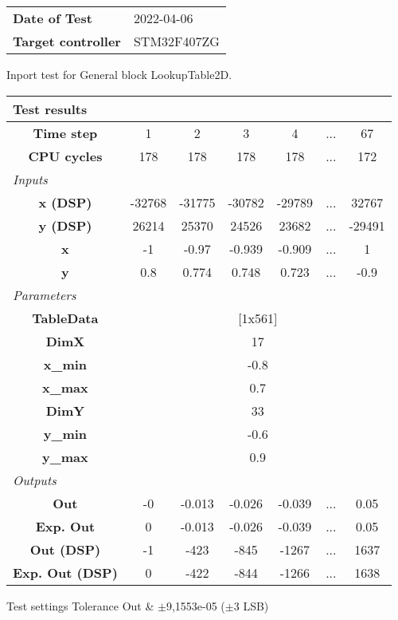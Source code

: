 \begin{tabular}{l l}
\textbf{Date of Test} & 2022-04-06 \tabularnewline
\textbf{Target controller} & STM32F407ZG \tabularnewline
\end{tabular}
\vspace{1ex}
Inport test for General block LookupTable2D.

\vspace{1em}
\begin{tabularx}{\textwidth}{|c|c|c|c|c|>{\centering\arraybackslash}X|c|}
\hline
\multicolumn{7}{|l|}{\cellcolor[gray]{0.8}\textbf{Test results}} \tabularnewline \hline
\textbf{Time step} & 1 & 2 & 3 & 4 & ... & 67 \tabularnewline \hline
\textbf{CPU cycles} & 178 & 178 & 178 & 178 & ... & 172 \tabularnewline \hline
\multicolumn{7}{|l|}{\cellcolor[gray]{0.9}\textit{Inputs}} \tabularnewline \hline
\textbf{x (DSP)} & -32768 & -31775 & -30782 & -29789 & ... & 32767 \tabularnewline \hline
\textbf{y (DSP)} & 26214 & 25370 & 24526 & 23682 & ... & -29491 \tabularnewline \hline
\textbf{x} & -1 & -0.97 & -0.939 & -0.909 & ... & 1 \tabularnewline \hline
\textbf{y} & 0.8 & 0.774 & 0.748 & 0.723 & ... & -0.9 \tabularnewline \hline
\multicolumn{7}{|l|}{\cellcolor[gray]{0.9}\textit{Parameters}} \tabularnewline \hline
\textbf{TableData} & \multicolumn{6}{c|}{[1x561]} \tabularnewline \hline
\textbf{DimX} & \multicolumn{6}{c|}{17} \tabularnewline \hline
\textbf{x\_min} & \multicolumn{6}{c|}{-0.8} \tabularnewline \hline
\textbf{x\_max} & \multicolumn{6}{c|}{0.7} \tabularnewline \hline
\textbf{DimY} & \multicolumn{6}{c|}{33} \tabularnewline \hline
\textbf{y\_min} & \multicolumn{6}{c|}{-0.6} \tabularnewline \hline
\textbf{y\_max} & \multicolumn{6}{c|}{0.9} \tabularnewline \hline
\multicolumn{7}{|l|}{\cellcolor[gray]{0.9}\textit{Outputs}} \tabularnewline \hline
\textbf{Out} & -0 & -0.013 & -0.026 & -0.039 & ... & 0.05 \tabularnewline \hline
\textbf{Exp. Out} & 0 & -0.013 & -0.026 & -0.039 & ... & 0.05 \tabularnewline \hline
\textbf{Out (DSP)} & -1 & -423 & -845 & -1267 & ... & 1637 \tabularnewline \hline
\textbf{Exp. Out (DSP)} & 0 & -422 & -844 & -1266 & ... & 1638 \tabularnewline \hline
\end{tabularx}
\vspace{1ex}

\begin{XtoCtabular}{Test settings}
Tolerance Out & $\pm$9,1553e-05 ($\pm$3 LSB) \tabularnewline \hline
\end{XtoCtabular}

